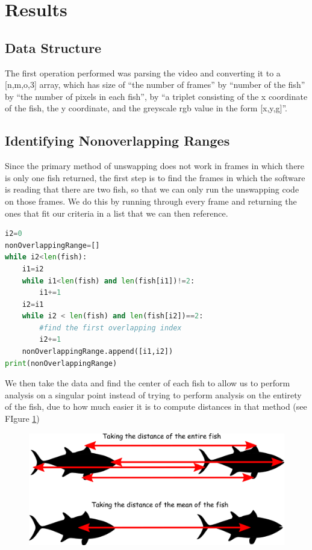 \documentclass[12pt]{article}
\begin{document}
\section{Results}

\subsection{Data Structure}
The first operation performed was parsing the video and converting it to a [n,m,o,3] array, which has size of ``the number of frames'' by ``number of the fish'' by ``the number of pixels in each fish'', by ``a triplet consisting of the x coordinate of the fish, the y coordinate, and the greyscale rgb value in the form [x,y,g]''. 

\subsection{Identifying Nonoverlapping Ranges}

Since the primary method of unswapping does not work in frames in which there is only one fish returned, the first step is to find the frames in which the software is reading that there are two fish, so that we can only run the unswapping code on those frames. We do this by running through every frame and returning the ones that fit our criteria in a list that we can then reference.

\begin{minipage}[c]{\textwidth}
\begin{lstlisting}[language=Python]
i2=0
nonOverlappingRange=[]
while i2<len(fish):
    i1=i2
    while i1<len(fish) and len(fish[i1])!=2:
        i1+=1
    i2=i1
    while i2 < len(fish) and len(fish[i2])==2:
        #find the first overlapping index
        i2+=1
    nonOverlappingRange.append([i1,i2])
print(nonOverlappingRange)
\end{lstlisting}
\end{minipage}

We then take the data and find the center of each fish to allow us to perform analysis on a singular point instead of trying to perform analysis on the entirety of the fish, due to how much easier it is to compute distances in that method (see FIgure \ref{fig:mean_sketch})
\begin{figure}[h] 
	\centering
	\includegraphics[width=.5\textwidth]{fish3}
	\caption{}
	\label{fig:mean_sketch}
\end{figure}
\end{document}
